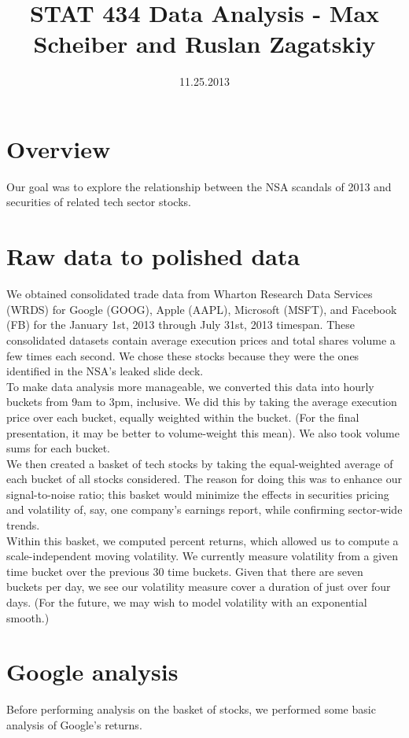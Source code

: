 \documentclass[11pt]{amsart}
\title{STAT 434 Data Analysis - Max Scheiber and Ruslan Zagatskiy}
\date{11.25.2013}
\begin{document}
\maketitle
\section{Overview}
Our goal was to explore the relationship between the NSA scandals of 2013 and securities of related tech sector stocks. \\

\section{Raw data to polished data}
We obtained consolidated trade data from Wharton Research Data Services (WRDS) for Google (GOOG), Apple (AAPL), Microsoft (MSFT), and Facebook (FB) for the January 1st, 2013 through July 31st, 2013 timespan. These consolidated datasets contain average execution prices and total shares volume a few times each second. We chose these stocks because they were the ones identified in the NSA's leaked slide deck. \\

To make data analysis more manageable, we converted this data into hourly buckets from 9am to 3pm, inclusive. We did this by taking the average execution price over each bucket, equally weighted within the bucket. (For the final presentation, it may be better to volume-weight this mean). We also took volume sums for each bucket. \\

We then created a basket of tech stocks by taking the equal-weighted average of each bucket of all stocks considered. The reason for doing this was to enhance our signal-to-noise ratio; this basket would minimize the effects in securities pricing and volatility of, say, one company's earnings report, while confirming sector-wide trends. \\

Within this basket, we computed percent returns, which allowed us to compute a scale-independent moving volatility. We currently measure volatility from a given time bucket over the previous 30 time buckets. Given that there are seven buckets per day, we see our volatility measure cover a duration of just over four days. (For the future, we may wish to model volatility with an exponential smooth.) \\

\newpage
\section{Google analysis}
Before performing analysis on the basket of stocks, we performed some basic analysis of Google's returns. \\
\end{document}
